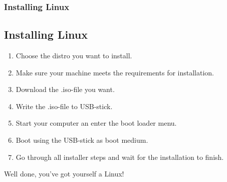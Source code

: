 \begin{frame}
	\frametitle{Installing Linux}
	\subsection{Installing Linux}
	
	\begin{enumerate}
		\item Choose the distro you want to install.
		\item Make sure your machine meets the requirements for installation.
		\item Download the .iso-file you want.
		\item Write the .iso-file to USB-stick.
		\item Start your computer an enter the boot loader menu.
		\item Boot using the USB-stick as boot medium.
		\item Go through all installer steps and wait for the installation to finish.
	\end{enumerate}

	\vspace{\baselineskip}

	Well done, you've got yourself a Linux!
\end{frame}
